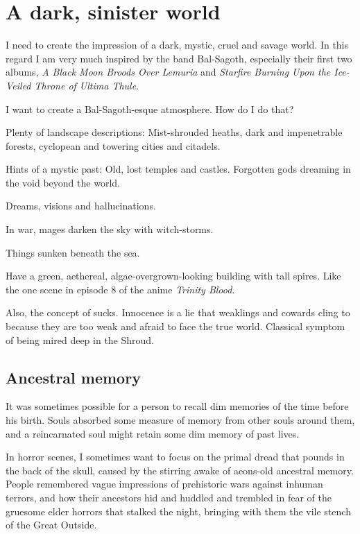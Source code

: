 \section{A dark, sinister world}
I need to create the impression of a dark, mystic, cruel and savage world. In this regard I am very much inspired by the band Bal-Sagoth, especially their first two albums, \emph{A Black Moon Broods Over Lemuria} and \emph{Starfire Burning Upon the Ice-Veiled Throne of Ultima Thule}. 

I want to create a Bal-Sagoth-esque atmosphere. How do I do that? 

Plenty of landscape descriptions: 
Mist-shrouded heaths, dark and impenetrable forests, cyclopean and towering cities and citadels. 

Hints of a mystic past: 
Old, lost temples and castles. 
Forgotten gods dreaming in the void beyond the world. 

Dreams, visions and hallucinations. 

In war, mages darken the sky with witch-storms. 

Things sunken beneath the sea.

Have a green, aethereal, algae-overgrown-looking building with tall spires. Like the one scene in episode 8 of the anime \emph{Trinity Blood}. 

Also, the concept of  sucks. Innocence is a lie that weaklings and cowards cling to because they are too weak and afraid to face the true world. Classical symptom of being mired deep in the Shroud. 









\subsection{Ancestral memory}
It was sometimes possible for a person to recall dim memories of the time before his birth. 
Souls absorbed some measure of memory from other souls around them, and a reincarnated soul might retain some dim memory of past lives. 

In horror scenes, I sometimes want to focus on the primal dread that pounds in the back of the skull, caused by the stirring awake of aeons-old ancestral memory.
People remembered vague impressions of prehistoric wars against inhuman terrors, and how their ancestors hid and huddled and trembled in fear of the gruesome elder horrors that stalked the night, bringing with them the vile stench of the Great Outside. 









